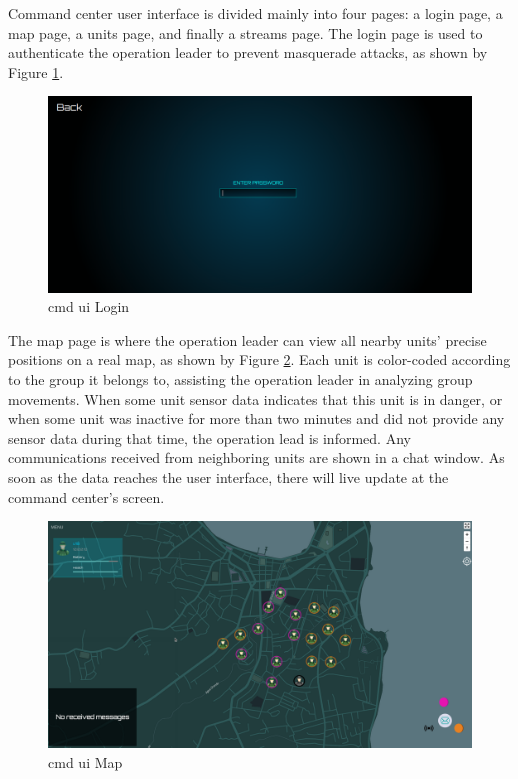 Command center user interface is divided mainly into four pages: a login page, a map page, a units page, and finally a streams page. 
The login page is used to authenticate the operation leader to prevent masquerade attacks, as shown by Figure \ref{fig:cmd-ui-login}.

\begin{figure}[!htb]
    \centering
    \includegraphics[width=15cm]{images/cmd-ui-login.png}
    \caption{\acrshort{cmd} \acrshort{ui} Login}
    \label{fig:cmd-ui-login}
\end{figure}


The map page is where the operation leader can view all nearby units' precise positions on a real map, as shown by Figure \ref{fig:cmd-ui-map-ch4}. Each unit is color-coded according to the group it belongs to, assisting the operation leader in analyzing group movements. When some unit sensor data indicates that this unit is in danger, or when some unit was inactive for more than two minutes and did not provide any sensor data during that time, the operation lead is informed. Any communications received from neighboring units are shown in a chat window. As soon as the data reaches the user interface, there will live update at the command center's screen. 

\begin{figure}[!htb]
    \centering
    \includegraphics[width=15cm]{images/cmd-ui-map.png}
    \caption{\acrshort{cmd} \acrshort{ui} Map}
    \label{fig:cmd-ui-map-ch4}
\end{figure}


